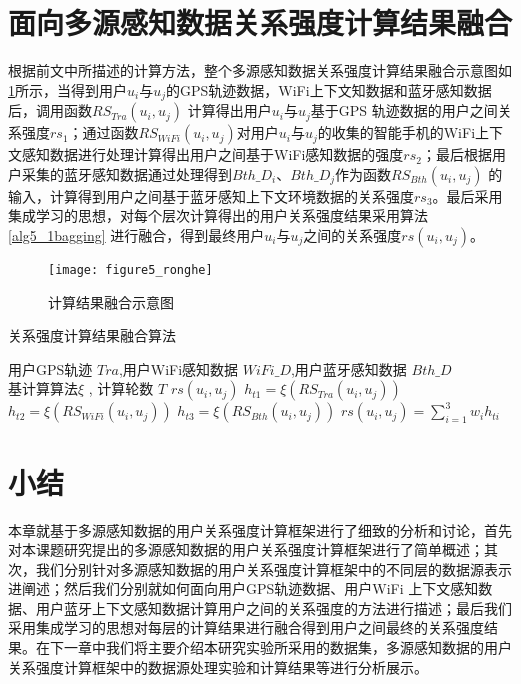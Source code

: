 \section{面向多源感知数据关系强度计算结果融合}
根据前文中所描述的计算方法，整个多源感知数据关系强度计算结果融合示意图如\ref{fig:ronghe}所示，当得到用户$u_{i}$与$u_{j}$的GPS轨迹数据，WiFi上下文知数据和蓝牙感知数据后，调用函数$RS_{Tra}(u_{i},u_{j})$ 计算得出用户$u_{i}$与$u_{j}$基于GPS 轨迹数据的用户之间关系强度$rs_{1}$；通过函数$RS_{WiFi}(u_{i},u_{j})$对用户$u_{i}$与$u_{j}$的收集的智能手机的WiFi上下文感知数据进行处理计算得出用户之间基于WiFi感知数据的强度$rs_{2}$；最后根据用户采集的蓝牙感知数据通过处理得到$Bth\_D_{i}$、$Bth\_D_{j}$作为函数$RS_{Bth}(u_{i},u_{j})$ 的输入，计算得到用户之间基于蓝牙感知上下文环境数据的关系强度$rs_{3}$。最后采用集成学习的思想，对每个层次计算得出的用户关系强度结果采用算法\ref{alg5_1bagging} 进行融合，得到最终用户$u_{i}$与$u_{j}$之间的关系强度$rs(u_{i},u_{j})$。
\begin{figure}[htb]
\centering
\texttt{[image: figure5\_ronghe]}
\caption{计算结果融合示意图}
\label{fig:ronghe}
\end{figure}

\begin{algorithm}[htb]
\caption{关系强度计算结果融合算法}
\label{alg5_1bagging}
\begin{algorithmic}[1] %
				\REQUIRE 用户GPS轨迹 $Tra$,用户WiFi感知数据 $WiFi\_D$,用户蓝牙感知数据 $Bth\_D$ \\ 基计算算法$\xi$ , 计算轮数 $T$
				\ENSURE $rs(u_{i},u_{j})$
				\STATE $h_{t1}=\xi (RS_{Tra}(u_{i},u_{j}))$
                \STATE $h_{t2}=\xi (RS_{WiFi}(u_{i},u_{j}))$
                \STATE $h_{t3}=\xi (RS_{Bth}(u_{i},u_{j}))$
				\ENDWHILE
				\STATE $rs(u_{i},u_{j})=\sum_{i=1}^{3}w_{i}h_{ti}$
\end{algorithmic}
\end{algorithm}

\newpage
\section{小结}
\label{sec:section4-4}
本章就基于多源感知数据的用户关系强度计算框架进行了细致的分析和讨论，首先对本课题研究提出的多源感知数据的用户关系强度计算框架进行了简单概述；其次，我们分别针对多源感知数据的用户关系强度计算框架中的不同层的数据源表示进阐述；然后我们分别就如何面向用户GPS轨迹数据、用户WiFi 上下文感知数据、用户蓝牙上下文感知数据计算用户之间的关系强度的方法进行描述；最后我们采用集成学习的思想对每层的计算结果进行融合得到用户之间最终的关系强度结果。在下一章中我们将主要介绍本研究实验所采用的数据集，多源感知数据的用户关系强度计算框架中的数据源处理实验和计算结果等进行分析展示。

